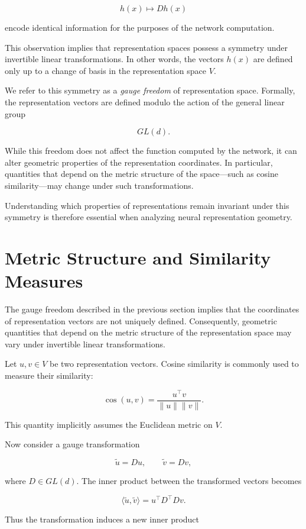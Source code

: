 \documentclass[11pt]{article}
\begin{document}
\[
h(x) \mapsto D h(x)
\]

encode identical information for the purposes of the network computation.

This observation implies that representation spaces possess a symmetry
under invertible linear transformations.
In other words, the vectors $h(x)$ are defined only up to a change of
basis in the representation space $V$.

We refer to this symmetry as a \emph{gauge freedom} of representation space.
Formally, the representation vectors are defined modulo the action of the
general linear group

\[
GL(d).
\]

While this freedom does not affect the function computed by the network,
it can alter geometric properties of the representation coordinates.
In particular, quantities that depend on the metric structure of the
space—such as cosine similarity—may change under such transformations.

Understanding which properties of representations remain invariant under
this symmetry is therefore essential when analyzing neural representation
geometry.

\section{Metric Structure and Similarity Measures}

The gauge freedom described in the previous section implies that the
coordinates of representation vectors are not uniquely defined.
Consequently, geometric quantities that depend on the metric structure
of the representation space may vary under invertible linear
transformations.

Let $u,v \in V$ be two representation vectors.
Cosine similarity is commonly used to measure their similarity:

\[
\cos(u,v) =
\frac{u^\top v}{\|u\|\|v\|}.
\]

This quantity implicitly assumes the Euclidean metric on $V$.

Now consider a gauge transformation

\[
\tilde u = D u,
\qquad
\tilde v = D v,
\]

where $D \in GL(d)$.
The inner product between the transformed vectors becomes

\[
\langle \tilde u,\tilde v\rangle
=
u^\top D^\top D v .
\]

Thus the transformation induces a new inner product
\end{document}
